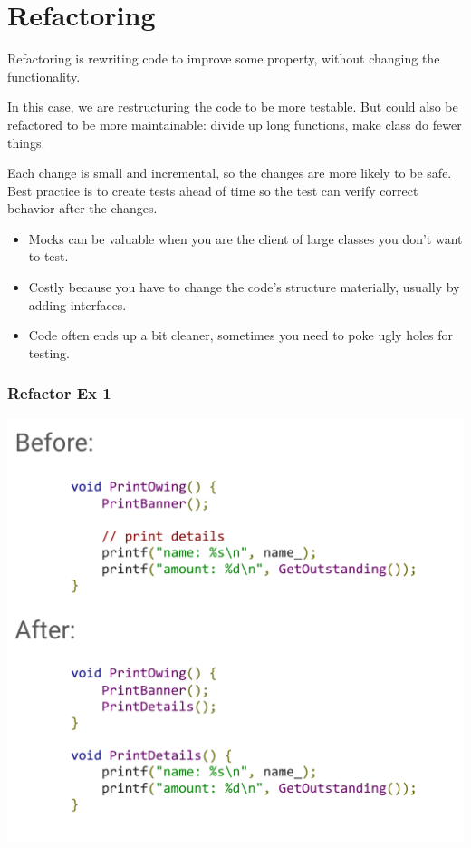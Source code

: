 \documentclass{article}
\begin{document}
\pagebreak

\section{Refactoring}

Refactoring is rewriting code to improve some property, without changing the functionality.

\vspace*{1em}

In this case, we are restructuring the code to be more testable. But could also be refactored to be more maintainable: divide up long functions, make class do fewer things.

\vspace*{1em}

Each change is small and incremental, so the changes are more likely to be safe. Best practice is to create tests ahead of time so the test can verify correct behavior after the changes.
\begin{itemize}
    \item Mocks can be valuable when you are the client of large classes you don't want to test.
    \item Costly because you have to change the code's structure materially, usually by adding interfaces.
    \item Code often ends up a bit cleaner, sometimes you need to poke ugly holes for testing.
\end{itemize}

\subsubsection*{Refactor Ex 1}

\includegraphics*[width=0.6\linewidth]{refactorEx1.png}
\end{document}
